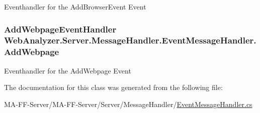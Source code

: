 Eventhandler for the Add\+Browser\+Event Event 

\hypertarget{class_web_analyzer_1_1_server_1_1_message_handler_1_1_event_message_handler_afe82749d8d848e38bb19ddc56f9c7fe6}{}
\subsubsection[{Add\+Webpage}]{\setlength{\rightskip}{0pt plus 5cm}Add\+Webpage\+Event\+Handler Web\+Analyzer.\+Server.\+Message\+Handler.\+Event\+Message\+Handler.\+Add\+Webpage}\label{class_web_analyzer_1_1_server_1_1_message_handler_1_1_event_message_handler_afe82749d8d848e38bb19ddc56f9c7fe6}


Eventhandler for the Add\+Webpage Event 



The documentation for this class was generated from the following file\+:\begin{DoxyCompactItemize}
\item 
M\+A-\/\+F\+F-\/\+Server/\+M\+A-\/\+F\+F-\/\+Server/\+Server/\+Message\+Handler/\hyperlink{_event_message_handler_8cs}{Event\+Message\+Handler.\+cs}\end{DoxyCompactItemize}
